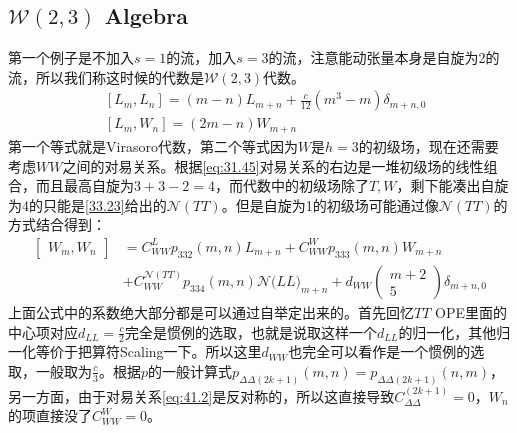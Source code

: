 \subsection{$\mathcal{W}(2,3)$ Algebra}
第一个例子是不加入$s=1$的流，加入$s=3$的流，注意能动张量本身是自旋为2的流，所以我们称这时候的代数是$\mathcal{W}(2,3)$代数。
\begin{equation}\label{eq:41.1}
	\begin{aligned}&\left[\left.L_m,L_n\right.\right]=\left(m-n\right)L_{m+n}+\frac c{12}\left(m^3-m\right)\delta_{m+n,0}\\&\left[\left.L_m,W_n\right.\right]=\left(2m-n\right)W_{m+n}\end{aligned}
\end{equation}
第一个等式就是Virasoro代数，第二个等式因为$W$是$h=3$的初级场，现在还需要考虑$WW$之间的对易关系。根据\ref{eq:31.45}对易关系的右边是一堆初级场的线性组合，而且最高自旋为$3+3-2=4$，而代数中的初级场除了$T,W$，剩下能凑出自旋为4的只能是\ref{33.23}给出的$\mathcal{N}(TT)$。但是自旋为1的初级场可能通过像$\mathcal{N}(TT)$的方式结合得到：
\begin{equation}\label{eq:41.2}
	\begin{aligned}
		\left.\left[\begin{array}{c}W_{m},W_{n}\end{array}\right.\right]& =C_{WW}^Lp_{332}(m,n)L_{m+n}+C_{WW}^Wp_{333}(m,n)W_{m+n}  \\
		&+C_{WW}^{\mathcal{N}(TT)}p_{334}(m,n)\mathcal{N}\big(LL\big)_{m+n}+d_{WW}\begin{pmatrix}m+2\\5\end{pmatrix}\delta_{m+n,0}
	\end{aligned}
\end{equation}
上面公式中的系数绝大部分都是可以通过自举定出来的。首先回忆$TT$ OPE里面的中心项对应$d_{LL}=\frac{c}{2}$完全是惯例的选取，也就是说取这样一个$d_{LL}$的归一化，其他归一化等价于把算符Scaling一下。所以这里$d_{WW}$也完全可以看作是一个惯例的选取，一般取为$\frac{c}{3}$。根据$p$的一般计算式$p_{\Delta\Delta(2k+1)}(m,n)=p_{\Delta\Delta(2k+1)}(n,m)$，另一方面，由于对易关系\ref{eq:41.2}是反对称的，所以这直接导致$C_{\Delta\Delta}^{(2k+1)}=0$，$W_n$的项直接没了$C_{WW}^{W}=0$。

